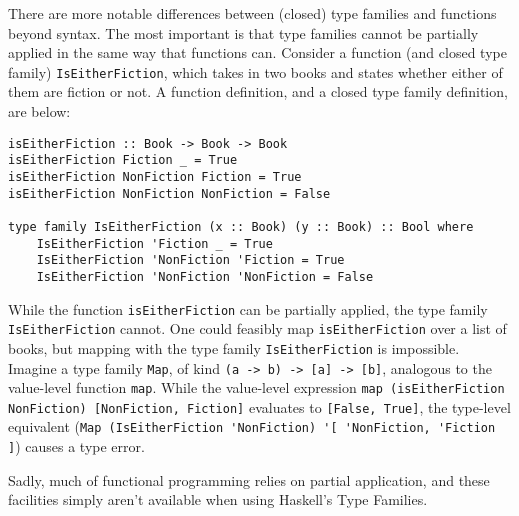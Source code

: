 \documentclass[12pt, a4paper, bibliography=totocnumbered]{scrreprt}
\newcommand{\inline}[1]{\lstinline[basicstyle=\ttfamily\footnotesize]{#1}}
\begin{document}
There are more notable differences between (closed) type families and functions beyond syntax. The most important is that type families cannot be partially applied in the same way that functions can. Consider a function (and closed type family) \inline{IsEitherFiction}, which takes in two books and states whether either of them are fiction or not. A function definition, and a closed type family definition, are below:

\begin{lstlisting}
isEitherFiction :: Book -> Book -> Book
isEitherFiction Fiction _ = True
isEitherFiction NonFiction Fiction = True
isEitherFiction NonFiction NonFiction = False

type family IsEitherFiction (x :: Book) (y :: Book) :: Bool where
    IsEitherFiction 'Fiction _ = True
    IsEitherFiction 'NonFiction 'Fiction = True
    IsEitherFiction 'NonFiction 'NonFiction = False
\end{lstlisting}

While the function \inline{isEitherFiction} can be partially applied, the type family \inline{IsEitherFiction} cannot. One could feasibly map \inline{isEitherFiction} over a list of books, but mapping with the type family \inline{IsEitherFiction} is impossible. Imagine a type family \inline{Map}, of kind \inline{(a -> b) -> [a] -> [b]}, analogous to the value-level function \inline{map}. While the value-level expression \inline{map (isEitherFiction NonFiction) [NonFiction, Fiction]} evaluates to \inline{[False, True]}, the type-level equivalent (\inline{Map (IsEitherFiction 'NonFiction) '[ 'NonFiction, 'Fiction ]}) causes a type error.

Sadly, much of functional programming relies on partial application, and these facilities simply aren't available when using Haskell's Type Families.



\end{document}
